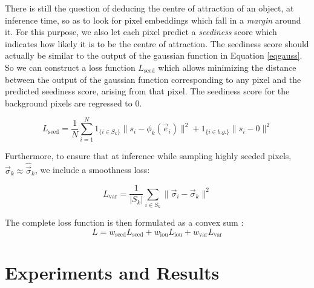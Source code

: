 \documentclass{midl} %
\begin{document}
There is still the question of deducing the centre of attraction of an object, at inference time, so as to look for pixel embeddings which fall in a \emph{margin} around it. For this purpose, we also let each pixel predict a \emph{seediness} score which indicates how likely it is to be the centre of attraction. The seediness score should actually be similar to the output of the gaussian function in Equation \eqref{eqgauss}. So we can construct a loss function $L_{\text{seed}}$ which allows minimizing the distance between the output of the gaussian function corresponding to any pixel and the predicted seediness score, arising from that pixel. The seediness score for the background pixels are regressed to 0.

\begin{equation}
    L_{\text{seed}}=\frac{1}{N} \sum_{i=1}^{N} 1_{\{i \in S_{k}\}} \lVert s_{i} - \phi_{k} (\vec{e}_{i}) \rVert^{2} +  1_{\{i \in b.g.\}} \lVert s_{i} - 0 \rVert^{2}
    \label{eqseed}
\end{equation}

Furthermore, to ensure that at inference while sampling highly seeded pixels, $\vec{\sigma}_{k} \approx \hat{\vec{\sigma}}_{k}$, we include a smoothness loss:


\begin{equation}
    L_{\text{var}}= \frac{1}{\vert S_{k} \vert}\sum_{i \in S_{k}} \lVert \vec{\sigma}_{i} - \vec{\sigma}_{k} \rVert^{2}
    \label{eqvar}
\end{equation}

The complete loss function is then formulated as a convex sum :
\begin{equation}
L = w_{\text{seed}} L_{\text{seed}} + w_{\text{iou}} L_{\text{iou}} + w_{\text{var}} L_{\text{var}}
\end{equation}

\section{Experiments and Results}
\resultsTwoDimensional


\resultsThreeDimensional
\threeDimensionalDataDescription
\end{document}
